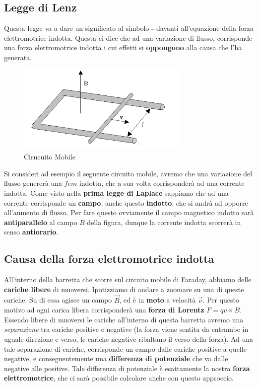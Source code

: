 \subsection{Legge di Lenz}
Questa legge va a dare un significato al simbolo \textbf{-} davanti all'equazione della forza elettromotrice indotta. Questa ci dice che ad una variazione di flusso, corrisponde una forza elettromotrice indotta i cui effetti si \textbf{oppongono} alla causa che l'ha generata. 

\begin{figure}[th]
	\centering
	\includegraphics{Media/circuito_mobile}
	\caption{Cirucuito Mobile}
	\label{fig:circuitomobile}
\end{figure}

Si consideri ad esempio il seguente circuito mobile, avremo che una variazione del flusso genererà una $fem$ indotta, che a sua volta corrisponderà ad una corrente indotta. Come visto nella \textbf{prima legge di Laplace} sappiamo che ad una corrente corrisponde un \textbf{campo}, anche questo \textbf{indotto}, che si andrà ad opporre all'aumento di flusso. Per fare questo ovviamente il campo magnetico indotto sarà \textbf{antiparallelo} al campo $B$ della figura, dunque la corrente indotta scorrerà in senso \textbf{antiorario}. 

\subsection{Causa della forza elettromotrice indotta}
All'interno della barretta che scorre sul circuito mobile di Faraday, abbiamo delle \textbf{cariche libere} di muoversi. Ipotizziamo di andare a zoomare su una di queste cariche. Su di essa agisce un campo $\vec{B}$, ed è in \textbf{moto} a velocità $\vec{v}$. Per questo motivo ad ogni carica libera corrisponderà una \textbf{forza di Lorentz} $F = qv \times B$. Essendo libere di muoversi le cariche all'interno di questa barretta avremo una \textit{separazione} tra cariche positive e negative (la forza viene sentita da entrambe in uguale direzione e verso, le cariche negative ribaltano il verso della forza). Ad una tale separazione di cariche, corrisponde un campo dalle cariche positive a quelle negative, e conseguentemente una \textbf{differenza di potenziale} che va dalle negative alle positive. Tale differenza di potenziale è esattamente la nostra \textbf{forza elettromotrice}, che ci sarà possibile calcolare anche con questo approccio. 

